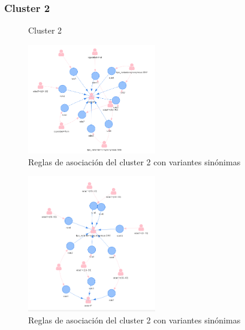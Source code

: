 \subsubsection*{Cluster 2}

\begin{figure}[H]
	\centering
	\caption{Cluster 2} \label{fig:c2}
\end{figure}

\begin{figure}[H]
	\centering
	\includegraphics[width=0.5\textwidth]{Kap4/reglas2_1}
	\caption{Reglas de asociación del cluster 2 con variantes sinónimas} \label{fig:reglas2_1}
\end{figure}

\begin{figure}[H]
	\centering
	\includegraphics[width=0.5\textwidth]{Kap4/reglas2_2}
	\caption{Reglas de asociación del cluster 2 con variantes sinónimas} \label{fig:reglas2_2}
\end{figure}

